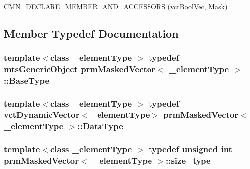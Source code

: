 {\bf }\par
\begin{DoxyCompactItemize}
\item 
\hyperlink{classprm_masked_vector_a87e8fdfa927cd5d3bbe2916e21242da0}{C\-M\-N\-\_\-\-D\-E\-C\-L\-A\-R\-E\-\_\-\-M\-E\-M\-B\-E\-R\-\_\-\-A\-N\-D\-\_\-\-A\-C\-C\-E\-S\-S\-O\-R\-S} (\hyperlink{vct_dynamic_vector_types_8h_aeb2237c134aee3769198bd9d55c8a9e0}{vct\-Bool\-Vec}, Mask)
\end{DoxyCompactItemize}



\subsection{Member Typedef Documentation}
\hypertarget{classprm_masked_vector_ad206ecada790ba4b049868d83fd2abc2}{
\subsubsection[{Base\-Type}]{\setlength{\rightskip}{0pt plus 5cm}template$<$class \-\_\-element\-Type $>$ typedef {\bf mts\-Generic\-Object} {\bf prm\-Masked\-Vector}$<$ \-\_\-element\-Type $>$\-::{\bf Base\-Type}}}\label{classprm_masked_vector_ad206ecada790ba4b049868d83fd2abc2}
\hypertarget{classprm_masked_vector_a7699da34296337db788196d01482defb}{
\subsubsection[{Data\-Type}]{\setlength{\rightskip}{0pt plus 5cm}template$<$class \-\_\-element\-Type $>$ typedef {\bf vct\-Dynamic\-Vector}$<$\-\_\-element\-Type$>$ {\bf prm\-Masked\-Vector}$<$ \-\_\-element\-Type $>$\-::{\bf Data\-Type}}}\label{classprm_masked_vector_a7699da34296337db788196d01482defb}
\hypertarget{classprm_masked_vector_af5110e0749d68ef7b7424a11d746b964}{
\subsubsection[{size\-\_\-type}]{\setlength{\rightskip}{0pt plus 5cm}template$<$class \-\_\-element\-Type $>$ typedef unsigned int {\bf prm\-Masked\-Vector}$<$ \-\_\-element\-Type $>$\-::{\bf size\-\_\-type}\hspace{0.3cm}{\ttfamily [protected]}}}\label{classprm_masked_vector_af5110e0749d68ef7b7424a11d746b964}
